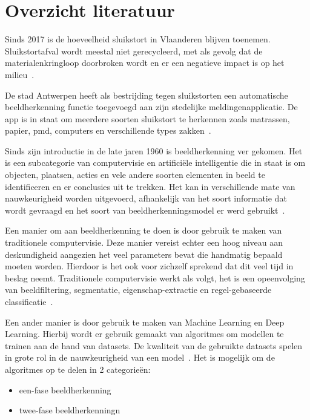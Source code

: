 \documentclass{hogent-article}
\begin{document}
\section{Overzicht literatuur}


Sinds 2017 is de hoeveelheid sluikstort in Vlaanderen blijven toenemen. Sluikstortafval wordt meestal niet gerecycleerd, met als gevolg dat de materialenkringloop doorbroken wordt en er een negatieve impact is op het milieu~\autocite{Baryon2021}.

De stad Antwerpen heeft als bestrijding tegen sluikstorten een automatische beeldherkenning functie toegevoegd aan zijn stedelijke meldingenapplicatie. De app is in staat om meerdere soorten sluikstort te herkennen  zoals matrassen, papier, pmd, computers en verschillende types zakken~\autocite{Antwerpen}.

Sinds zijn introductie in de late jaren 1960 is beeldherkenning ver gekomen. Het is een subcategorie van computervisie en artificiële intelligentie die in staat is om objecten, plaatsen, acties en vele andere soorten elementen in beeld te identificeren en er conclusies uit te trekken. Het kan in verschillende mate van nauwkeurigheid worden uitgevoerd, afhankelijk van het soort informatie dat wordt gevraagd en het soort van beeldherkenningsmodel er werd gebruikt~\autocite{Ewan}.

Een manier om aan beeldherkenning te doen is door gebruik te maken van traditionele computervisie. Deze manier vereist echter een hoog niveau aan deskundigheid aangezien het veel parameters bevat die handmatig bepaald moeten worden. Hierdoor is het ook voor zichzelf sprekend dat dit veel tijd in beslag neemt. Traditionele computervisie werkt als volgt, het is een opeenvolging van beeldfiltering, segmentatie, eigenschap-extractie en regel-gebaseerde classificatie~\autocite{Meel}.

Een ander manier is door gebruik te maken van Machine Learning en Deep Learning. Hierbij wordt er gebruik gemaakt van algoritmes om modellen te trainen aan de hand van datasets. De kwaliteit van de gebruikte datasets spelen in grote rol in de nauwkeurigheid van een model~\autocite{Haponik2022}. Het is mogelijk om de algoritmes op te delen in 2 categorieën:

\begin{itemize}
    \item een-fase beeldherkenning
    \item twee-fase beeldherkenningn
\end{itemize}
\end{document}
